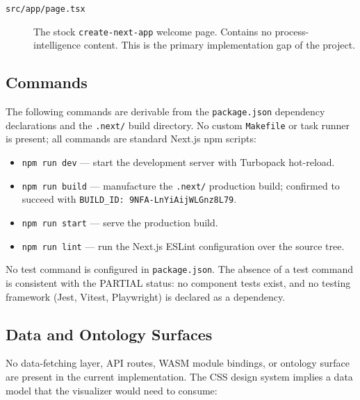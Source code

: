 \begin{description}
  \item[\texttt{src/app/page.tsx}]
    The stock \texttt{create-next-app} welcome page. Contains no process-intelligence
    content. This is the primary implementation gap of the project.
\end{description}

\subsection{Commands}
\label{sec:experiments-visualizer-nextjs-impl-commands}

The following commands are derivable from the \texttt{package.json} dependency declarations
and the \texttt{.next/} build directory. No custom \texttt{Makefile} or task runner is
present; all commands are standard Next.js npm scripts:

\begin{itemize}
  \item \texttt{npm run dev} --- start the development server with Turbopack hot-reload.
  \item \texttt{npm run build} --- manufacture the \texttt{.next/} production build;
        confirmed to succeed with \texttt{BUILD\_ID: 9NFA-LnYiAijWLGnz8L79}.
  \item \texttt{npm run start} --- serve the production build.
  \item \texttt{npm run lint} --- run the Next.js ESLint configuration over the source tree.
\end{itemize}

No test command is configured in \texttt{package.json}. The absence of a test command is
consistent with the PARTIAL status: no component tests exist, and no testing framework
(Jest, Vitest, Playwright) is declared as a dependency.

\subsection{Data and Ontology Surfaces}
\label{sec:experiments-visualizer-nextjs-impl-data}

No data-fetching layer, API routes, WASM module bindings, or ontology surface are present
in the current implementation. The CSS design system implies a data model that the visualizer
would need to consume:

